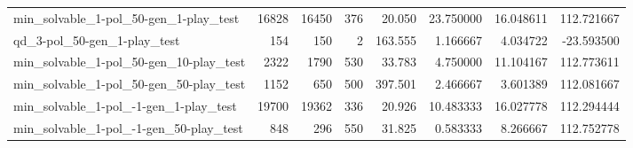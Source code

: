 \begin{tabular}{lrrrrrrr}
min\_solvable\_1-pol\_50-gen\_1-play\_test  &    16828 &    16450 &       376 &   20.050 &    23.750000 &  16.048611 &  112.721667 \\
qd\_3-pol\_50-gen\_1-play\_test            &      154 &      150 &         2 &  163.555 &     1.166667 &   4.034722 &  -23.593500 \\
min\_solvable\_1-pol\_50-gen\_10-play\_test &     2322 &     1790 &       530 &   33.783 &     4.750000 &  11.104167 &  112.773611 \\
min\_solvable\_1-pol\_50-gen\_50-play\_test &     1152 &      650 &       500 &  397.501 &     2.466667 &   3.601389 &  112.081667 \\
min\_solvable\_1-pol\_-1-gen\_1-play\_test  &    19700 &    19362 &       336 &   20.926 &    10.483333 &  16.027778 &  112.294444 \\
min\_solvable\_1-pol\_-1-gen\_50-play\_test &      848 &      296 &       550 &   31.825 &     0.583333 &   8.266667 &  112.752778 \\
\bottomrule
\end{tabular}
